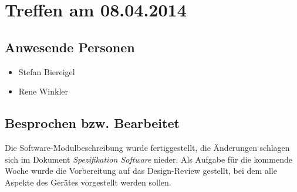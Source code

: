 \chapter{Treffen am 08.04.2014}
\section{Anwesende Personen}
\begin{itemize}
	\item Stefan Biereigel
	\item Rene Winkler
\end{itemize}

\section{Besprochen bzw. Bearbeitet}
Die Software-Modulbeschreibung wurde fertiggestellt, die Änderungen schlagen sich im Dokument \textit{Spezifikation Software} nieder. Als Aufgabe für die kommende Woche wurde die Vorbereitung auf das Design-Review gestellt, bei dem alle Aspekte des Gerätes vorgestellt werden sollen.
